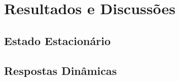 %
% 
%
\chapter{Resultados e Discussões} \label{chap:resultados}
% 
\section{Estado Estacionário} \label{sec:estadoestacionario}

\section{Respostas Dinâmicas} \label{sec:respostasdinamicas}